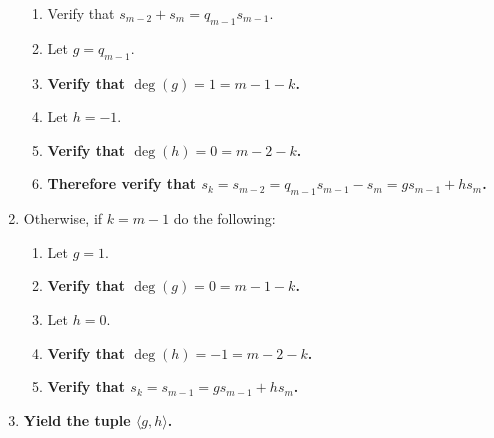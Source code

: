 \documentclass[twocolumn]{article}
\begin{document}
\begin{enumerate}
					\begin{enumerate}
						\item Verify that $s_{m-2}+s_m=q_{m-1}s_{m-1}$.
						\item Let $g=q_{m-1}$.
						\item \textbf{Verify that $\deg(g)=1=m-1-k$.}
						\item Let $h=-1$.
						\item \textbf{Verify that $\deg(h)=0=m-2-k$.}
						\item \textbf{Therefore verify that $s_k=s_{m-2}=q_{m-1}s_{m-1}-s_m=gs_{m-1}+hs_m$.}
					\end{enumerate}
					\item Otherwise, if $k=m-1$ do the following:
					\begin{enumerate}
						\item Let $g=1$.
						\item \textbf{Verify that $\deg(g)=0=m-1-k$.}
						\item Let $h=0$.
						\item \textbf{Verify that $\deg(h)=-1=m-2-k$.}
						\item \textbf{Verify that $s_k=s_{m-1}=gs_{m-1}+hs_m$.}
					\end{enumerate}
					\item \textbf{Yield the tuple $\langle g,h\rangle$.}
				\end{enumerate}
\end{document}
